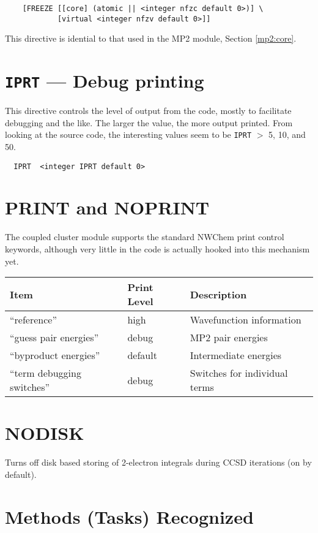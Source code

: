 \begin{verbatim}
    [FREEZE [[core] (atomic || <integer nfzc default 0>)] \
            [virtual <integer nfzv default 0>]]
\end{verbatim}

This directive is idential to that used in the MP2 module, Section
\ref{mp2:core}.

\section{{\tt IPRT} --- Debug printing}

This directive controls the level of output from the code, mostly to
facilitate debugging and the like.  The larger the value, the more
output printed.  From looking at the source code, the interesting
values seem to be \verb+IPRT+ $>$ 5, 10, and 50.

\begin{verbatim}
  IPRT  <integer IPRT default 0>
\end{verbatim}

\section{PRINT and NOPRINT}

The coupled cluster module supports the standard NWChem print control
keywords, although very little in the code is actually hooked into
this mechanism yet.

\begin{tabular}{lll}
\hline\hline
Item                    & Print Level   & Description \\
\hline
``reference''             & high          & Wavefunction information\\
``guess pair energies'' & debug & MP2 pair energies\\
``byproduct energies'' & default & Intermediate energies   \\
``term debugging switches'' & debug & Switches for individual terms \\
\hline\hline
\end{tabular}

\section{NODISK}

Turns off disk based storing of 2-electron integrals during CCSD
iterations (on by default).

\section{Methods (Tasks) Recognized}

